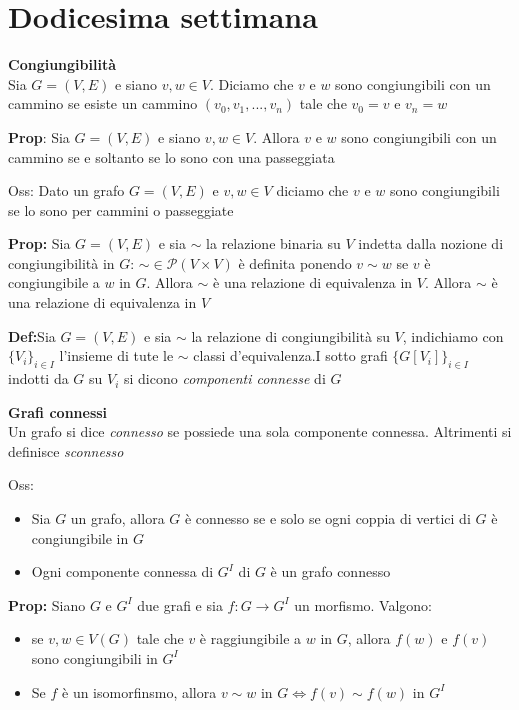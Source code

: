 \documentclass[12pt, a4paper]{article}
\begin{document}
\newpage
\section{Dodicesima settimana}
\textbf{Congiungibilità}\\ Sia $G=(V,E)$ e siano $v,w\in V$. Diciamo che $v$ e $w$ sono congiungibili con un cammino
se esiste un cammino $(v_{0},v_{1},...,v_{n})$ tale che $v_{0}=v$ e $v_{n}=w$

\textbf{Prop}: Sia $G=(V,E)$ e siano $v,w\in V$. Allora $v$ e $w$ sono congiungibili con un cammino se e soltanto 
se lo sono con una passeggiata

Oss: Dato un grafo $G=(V,E)$ e $v,w\in V$ diciamo che $v$ e $w$ sono congiungibili se lo sono per cammini o
passeggiate

\textbf{Prop:} Sia $G=(V,E)$ e sia $\sim$ la relazione binaria su $V$ indetta dalla nozione di congiungibilità
in $G$: $\sim\in\mathcal{P}(V\times V)$ è definita ponendo $v\sim w$ se $v$ è congiungibile a $w$ in $G$.
Allora $\sim$ è una relazione di equivalenza in $V$. Allora $\sim$ è una relazione di equivalenza in $V$

\textbf{Def:}Sia $G=(V,E)$ e  sia $\sim$ la relazione di congiungibilità su $V$, indichiamo con $\{V_{i}\}_{i\in I}$
l'insieme di tute le $\sim$ classi d'equivalenza.I sotto grafi $\{G[V_{i}]\}_{i\in I}$ indotti  da $G$ su $V_{i}$
si dicono \textit{componenti connesse} di $G$

\textbf{Grafi connessi}\\Un grafo si dice \textit{connesso} se possiede una sola componente connessa. Altrimenti
si definisce \textit{sconnesso}

Oss:
\begin{itemize}
    \item Sia $G$ un grafo, allora $G$ è connesso se e solo se ogni coppia di vertici di $G$ è congiungibile
    in $G$
    \item Ogni componente connessa di $G^{I}$ di $G$ è un grafo connesso
\end{itemize}

\textbf{Prop:} Siano $G$ e $G^{I}$ due grafi e sia $f:G\to G^{I}$ un morfismo. Valgono:
\begin{itemize}
    \item se $v,w\in V(G)$ tale che $v$ è raggiungibile a $w$ in $G$, allora $f(w)$ e $f(v)$ sono 
    congiungibili in $G^{I}$
    \item Se $f$ è un isomorfinsmo, allora $v\sim w$ in $G\Leftrightarrow f(v)\sim f(w)$ in $G^{I}$
\end{itemize}
\end{document}
